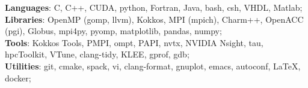 \selectfont
{\textbf{Languages}: C, C++, CUDA, python, Fortran, Java,  bash, csh, VHDL, Matlab};\\
{\textbf{Libraries}:  OpenMP (gomp, llvm), Kokkos, MPI (mpich), Charm++, OpenACC (pgi), Globus},  mpi4py, pyomp, matplotlib, pandas, numpy; \\
{\textbf{Tools}: Kokkos Tools, PMPI, ompt, PAPI, nvtx, NVIDIA Nsight, tau, hpcToolkit, VTune, clang-tidy, KLEE,  gprof, gdb}; \\
{\textbf{Utilities}: git, cmake, spack, vi, clang-format, gnuplot, emacs, autoconf, LaTeX, docker};\\